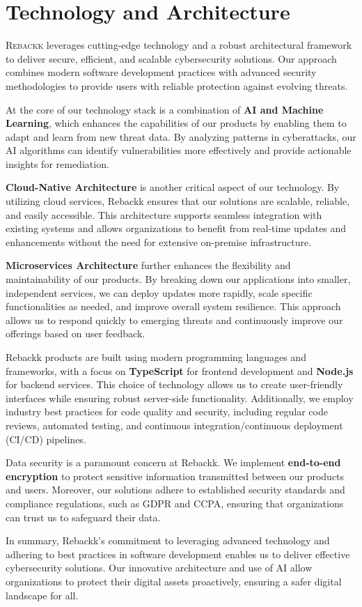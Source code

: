 \chapter{Technology and Architecture}

\lettrine{R}{ebackk} leverages cutting-edge technology and a robust architectural framework to deliver secure, efficient, and scalable cybersecurity solutions. Our approach combines modern software development practices with advanced security methodologies to provide users with reliable protection against evolving threats.

At the core of our technology stack is a combination of \textbf{AI and Machine Learning}, which enhances the capabilities of our products by enabling them to adapt and learn from new threat data. By analyzing patterns in cyberattacks, our AI algorithms can identify vulnerabilities more effectively and provide actionable insights for remediation.

\textbf{Cloud-Native Architecture} is another critical aspect of our technology. By utilizing cloud services, Rebackk ensures that our solutions are scalable, reliable, and easily accessible. This architecture supports seamless integration with existing systems and allows organizations to benefit from real-time updates and enhancements without the need for extensive on-premise infrastructure.

\textbf{Microservices Architecture} further enhances the flexibility and maintainability of our products. By breaking down our applications into smaller, independent services, we can deploy updates more rapidly, scale specific functionalities as needed, and improve overall system resilience. This approach allows us to respond quickly to emerging threats and continuously improve our offerings based on user feedback.

Rebackk products are built using modern programming languages and frameworks, with a focus on \textbf{TypeScript} for frontend development and \textbf{Node.js} for backend services. This choice of technology allows us to create user-friendly interfaces while ensuring robust server-side functionality. Additionally, we employ industry best practices for code quality and security, including regular code reviews, automated testing, and continuous integration/continuous deployment (CI/CD) pipelines.

Data security is a paramount concern at Rebackk. We implement \textbf{end-to-end encryption} to protect sensitive information transmitted between our products and users. Moreover, our solutions adhere to established security standards and compliance regulations, such as GDPR and CCPA, ensuring that organizations can trust us to safeguard their data.

In summary, Rebackk’s commitment to leveraging advanced technology and adhering to best practices in software development enables us to deliver effective cybersecurity solutions. Our innovative architecture and use of AI allow organizations to protect their digital assets proactively, ensuring a safer digital landscape for all.